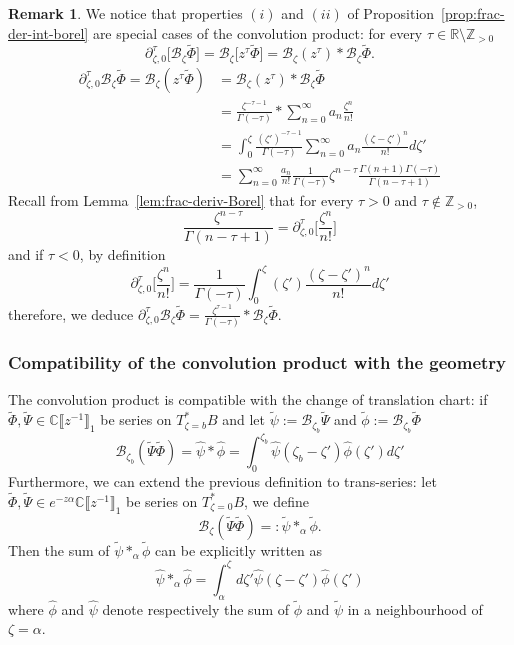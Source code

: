 \documentclass{article}
\newcommand{\Z}{\mathbb{Z}}
\newcommand{\R}{\mathbb{R}}
\newcommand{\C}{\mathbb{C}}
\newcommand{\series}[1]{\tilde{#1}}
\newcommand{\fracderiv}[3]{\partial^{#1}_{#2, #3}}
\newcommand{\borel}{\mathcal{B}}
\theoremstyle{definition}
\newtheorem{remark}[definition]{Remark}
\theoremstyle{plain}
\newenvironment{verify}{\color{ForestGreen}}{\color{black}}
\begin{document}
\begin{remark}
We notice that properties $(i)$ and $(ii)$ of Proposition~\ref{prop:frac-der-int-borel} are special cases of the convolution product: for every $\tau\in\R\setminus\Z_{>0}$ 
\[\fracderiv{\tau}{\zeta}{0}\big[\borel_\zeta\tilde{\Phi}\big]=\borel_\zeta \big[z^\tau \tilde{\Phi}\big]=\borel_\zeta (z^\tau)\ast \borel_\zeta\tilde{\Phi}.\]
\begin{verify}
\begin{align*}
\fracderiv{\tau}{\zeta}{0}\borel_\zeta\tilde{\Phi}=\borel_\zeta (z^\tau \tilde{\Phi})&=\borel_\zeta (z^\tau)\ast \borel_\zeta\tilde{\Phi}\\
&=\frac{\zeta^{-\tau-1}}{\Gamma(-\tau)}\ast\sum_{n=0}^\infty a_n \frac{\zeta^n}{n!}\\
&=\int_0^\zeta \frac{(\zeta')^{-\tau-1}}{\Gamma(-\tau)}\sum_{n= 0}^\infty a_n\frac{(\zeta-\zeta')^n}{n!}d\zeta'\\
&=\sum_{n= 0}^\infty\frac{a_n}{n!}\frac{1}{\Gamma(-\tau)}\zeta^{n-\tau}\frac{\Gamma(n+1)\Gamma(-\tau)}{\Gamma(n-\tau+1)}
\end{align*}
Recall from Lemma~\ref{lem:frac-deriv-Borel} that for every 
$\tau>0$ and $\tau\notin\Z_{>0}$, 
\[\frac{\zeta^{n-\tau}}{\Gamma(n-\tau+1)}=\fracderiv{\tau}{\zeta}{0}\Big[\frac{\zeta^n}{n!}\Big]
\]
and if $\tau<0$, by definition 
\[\fracderiv{\tau}{\zeta}{0}\Big[\frac{\zeta^n}{n!}\Big]=\frac{1}{\Gamma(-\tau)}\int_0^\zeta (\zeta')\frac{(\zeta-\zeta')^n}{n!}d\zeta'\]
therefore, we deduce $\fracderiv{\tau}{\zeta}{0}\borel_\zeta\tilde{\Phi}=\frac{\zeta^{\tau-1}}{\Gamma(-\tau)}\ast\borel_\zeta\tilde{\Phi}$. 
\end{verify}
\end{remark}
\subsubsection{Compatibility of the convolution product with the geometry}\label{sec:convolution-compatible}
The convolution product is compatible with the change of translation chart: if $\tilde{\Phi}, \tilde{\Psi}\in \C \llbracket z^{-1} \rrbracket_1$ be series on $T^*_{\zeta=b}B$ and let $\series{\psi}:=\borel_{\zeta_b}\series{\Psi}$ and $\series{\phi}:=\borel_{\zeta_b}\series{\Phi}$
\[\borel_{\zeta_b}(\series{\Psi}\series{\Phi})=\hat{\psi}\ast \hat{\phi}=\int_{0}^{\zeta_b}\hat{\psi}(\zeta_b-\zeta')\hat{\phi}(\zeta')d\zeta'\]
Furthermore, we can extend the previous definition to trans-series: let $\tilde{\Phi}, \tilde{\Psi}\in e^{-z\alpha}\C \llbracket z^{-1} \rrbracket_1$ be series on $T^*_{\zeta=0} B$, we define \[\borel_{\zeta}(\series{\Psi}\series{\Phi})=:\series{\psi}\ast_\alpha\series{\phi}.\]
Then the sum of $\series{\psi}\ast_\alpha\series{\phi}$ can be explicitly written as 
\begin{equation}
    \hat{\psi}\ast_\alpha\hat{\phi}=\int_\alpha^{\zeta}d\zeta' \hat{\psi}(\zeta-\zeta')\hat{\phi}(\zeta')
\end{equation}
where $\hat{\phi}$ and $\hat{\psi}$ denote respectively the sum of $\tilde{\phi}$ and $\tilde{\psi}$ in a neighbourhood of $\zeta=\alpha$. 
\end{document}
